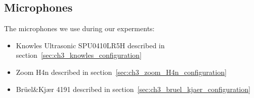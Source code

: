 \subsection{Microphones}
The microphones we use during our experments:

\begin{itemize}[topsep=-1em,parsep=0em,itemsep=0em]
 \item Knowles Ultrasonic SPU0410LR5H described in section~\ref{sec:ch3_knowles_configuration}
 \item Zoom H4n described in section~\ref{sec:ch3_zoom_H4n_configuration}
 \item Brüel\&Kjær 4191 described in section~\ref{sec:ch3_bruel_kjaer_configuration}
\end{itemize}
